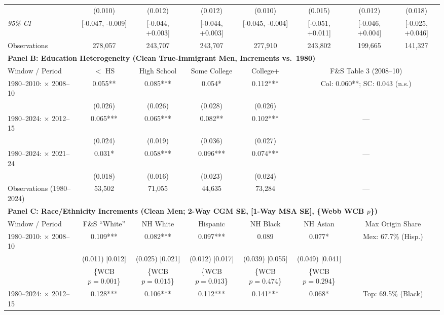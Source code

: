 \begin{table}[t!]
{\begin{tabular}{lccccccc}
 & (0.010) & (0.012) & (0.012) & (0.010) & (0.015) & (0.012) & (0.018) \\
\textit{95\% CI} & [-0.047, -0.009] & [-0.044, +0.003] & [-0.044, +0.003] & [-0.045, -0.004] & [-0.051, +0.011] & [-0.046, +0.004] & [-0.025, +0.046] \\
Observations & 278,057 & 243,707 & 243,707 & 277,910 & 243,802 & 199,665 & 141,327 \\
\midrule
\multicolumn{8}{l}{\textbf{Panel B: Education Heterogeneity (Clean True-Immigrant Men, Increments vs.\ 1980)}} \\
\midrule
Window / Period & $<$ HS & High School & Some College & College+ & \multicolumn{3}{c}{F\&S Table 3 (2008--10)} \\
\midrule
1980--2010: $\times$ 2008--10 & 0.055** & 0.085*** & 0.054* & 0.112*** & \multicolumn{3}{c}{Col: 0.060**; SC: 0.043 (n.s.)} \\
 & (0.026) & (0.026) & (0.028) & (0.026) & \multicolumn{3}{c}{} \\
1980--2024: $\times$ 2012--15 & 0.065*** & 0.065*** & 0.082** & 0.102*** & \multicolumn{3}{c}{---} \\
 & (0.024) & (0.019) & (0.036) & (0.027) & \multicolumn{3}{c}{} \\
1980--2024: $\times$ 2021--24 & 0.031* & 0.058*** & 0.096*** & 0.074*** & \multicolumn{3}{c}{---} \\
 & (0.018) & (0.016) & (0.023) & (0.024) & \multicolumn{3}{c}{} \\
Observations (1980--2024) & 53,502 & 71,055 & 44,635 & 73,284 & \multicolumn{3}{c}{---} \\
\midrule
\multicolumn{8}{l}{\textbf{Panel C: Race/Ethnicity Increments (Clean Men; 2-Way CGM SE, [1-Way MSA SE], \{Webb WCB $p$\})}} \\
\midrule
Window / Period & F\&S ``White'' & NH White & Hispanic & NH Black & NH Asian & \multicolumn{2}{c}{Max Origin Share} \\
\midrule
1980--2010: $\times$ 2008--10 & 0.109*** & 0.082*** & 0.097*** & 0.089 & 0.077* & \multicolumn{2}{c}{Mex: 67.7\% (Hisp.)} \\
 & (0.011) [0.012] & (0.025) [0.021] & (0.012) [0.017] & (0.039) [0.055] & (0.049) [0.041] & \multicolumn{2}{c}{} \\
 & \{WCB $p=0.001$\} & \{WCB $p=0.015$\} & \{WCB $p=0.013$\} & \{WCB $p=0.474$\} & \{WCB $p=0.294$\} & \multicolumn{2}{c}{} \\
1980--2024: $\times$ 2012--15 & 0.128*** & 0.106*** & 0.112*** & 0.141*** & 0.068* & \multicolumn{2}{c}{Top: 69.5\% (Black)} \\

\end{tabular}}
\end{table}

